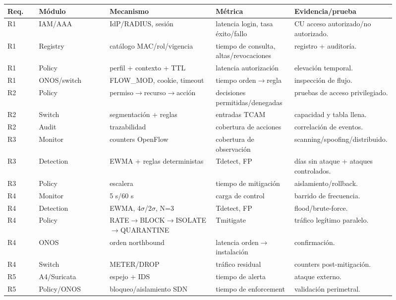 \documentclass[11pt,a4paper]{article}
\begin{document}
\begin{longtable}{p{0.08\linewidth}p{0.18\linewidth}p{0.27\linewidth}p{0.2\linewidth}p{0.18\linewidth}}
\toprule
Req. & Módulo & Mecanismo & Métrica & Evidencia/prueba\\
\midrule
R1 & IAM/AAA & IdP/RADIUS, sesión & latencia login, tasa éxito/fallo & CU acceso autorizado/no autorizado.\\
R1 & Registry & catálogo MAC/rol/vigencia & tiempo de consulta, altas/revocaciones & registro + auditoría.\\
R1 & Policy & perfil + contexto + TTL & latencia autorización & elevación temporal.\\
R1 & ONOS/switch & FLOW\_MOD, cookie, timeout & tiempo orden\(\rightarrow\)regla & inspección de flujo.\\
R2 & Policy & permiso\(\rightarrow\)recurso\(\rightarrow\)acción & decisiones permitidas/denegadas & pruebas de acceso privilegiado.\\
R2 & Switch & segmentación + reglas & entradas TCAM & capacidad y tabla llena.\\
R2 & Audit & trazabilidad & cobertura de acciones & correlación de eventos.\\
R3 & Monitor & counters OpenFlow & cobertura de observación & scanning/spoofing/distribuido.\\
R3 & Detection & EWMA + reglas deterministas & Tdetect, FP & días sin ataque + ataques controlados.\\
R3 & Policy & escalera & tiempo de mitigación & aislamiento/rollback.\\
R4 & Monitor & 5 s/60 s & carga de control & barrido de frecuencia.\\
R4 & Detection & EWMA, 4$\sigma$/2$\sigma$, N=3 & Tdetect, FP & flood/brute-force.\\
R4 & Policy & RATE\(\rightarrow\)BLOCK\(\rightarrow\)ISOLATE\(\rightarrow\)QUARANTINE & Tmitigate & tráfico legítimo paralelo.\\
R4 & ONOS & orden northbound & latencia orden\(\rightarrow\)instalación & confirmación.\\
R4 & Switch & METER/DROP & tráfico residual & counters post-mitigación.\\
R5 & A4/Suricata & espejo + IDS & tiempo de alerta & ataque externo.\\
R5 & Policy/ONOS & bloqueo/aislamiento SDN & tiempo de enforcement & validación perimetral.\\
\bottomrule
\end{longtable}
\end{document}
